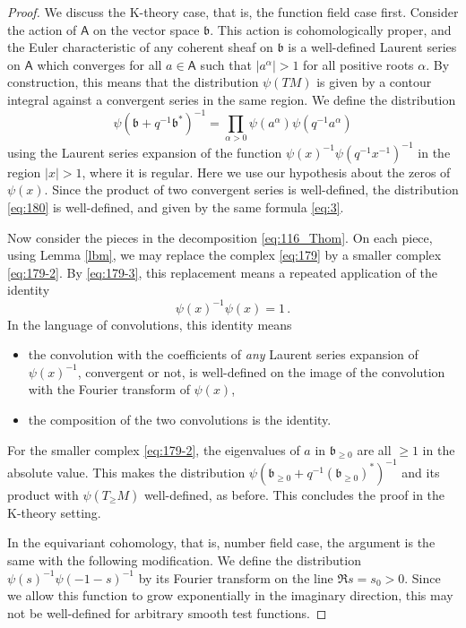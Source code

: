 \documentclass[14pt]{extarticle}
\newcommand{\bA}{\mathsf{A}}
\newcommand{\fb}{\mathfrak{b}}
\theoremstyle{definition}
\begin{document}
\begin{proof}
We discuss the K-theory case, that is, the function field case
first.  Consider the action of $\bA$ on the vector
space $\fb$. This action is cohomologically proper, and the
Euler characteristic of any coherent sheaf on $\fb$ is a well-defined
Laurent series on $\bA$ which converges for all $a\in \bA$ such that
$|a^\alpha|>1$ for all positive roots $\alpha$. By construction, this
means that the distribution $\psi(TM)$ is given by a contour integral against
a convergent series in the same region. We define
the distribution
\[ 
\psi(\fb+q^{-1} \fb^*)^{-1} =  \prod_{\alpha >0} \psi(a^{\alpha})
\psi(q^{-1} a^{\alpha})
\]
using the Laurent
series expansion of the function $\psi(x)^{-1} \psi(q^{-1} x^{-1})^{-1}$ in the region
$|x| > 1$, where it is regular. Here we use our hypothesis about the
zeros of $\psi(x)$. Since the product of two convergent
series is well-defined, the distribution \eqref{eq:180} is
well-defined, and given by the same formula \eqref{eq:3}.

Now consider the pieces in the decomposition \eqref{eq:116_Thom}. On
each piece, using Lemma \ref{lbm}, we may replace the complex \eqref{eq:179} by a smaller
complex \eqref{eq:179-2}. By \eqref{eq:179-3}, this replacement means a repeated
application of the identity
\[
  \psi(x)^{-1} \psi(x) =1 \,.
\]
In the language of convolutions, this identity means
\begin{itemize}
\item the convolution with the coefficients of \emph{any} Laurent
series expansion of $\psi(x)^{-1}$, convergent or not,  is well-defined on the image of the
convolution with the Fourier transform of $\psi(x)$,
\item the composition of the two convolutions is the identity.
\end{itemize}
%
For the
smaller complex \eqref{eq:179-2}, the eigenvalues of $a$ in $\fb_{\ge 0}$ are all
$\ge 1$ in the absolute value. This makes the 
distribution $\psi(\fb_{\ge 0}+q^{-1} (\fb_{\ge 0})^*)^{-1}$ and its 
product with $\psi(T_\ge M)$ well-defined, as before.
This concludes the proof in the K-theory setting.

In the equivariant cohomology, that is, number field case, the
argument is the same with the following modification. We define the
distribution $\psi(s)^{-1} \psi(-1-s)^{-1}$ by its Fourier transform
on the line  $\Re s = s_0 > 0$. Since
we allow this function to grow exponentially in the imaginary
direction, this may not
be well-defined for arbitrary smooth test functions. 


\end{proof}
\end{document}
